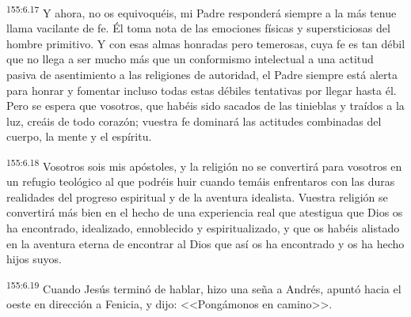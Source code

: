 \par 
\textsuperscript{155:6.17} Y ahora, no os equivoquéis, mi Padre responderá siempre a la más tenue llama vacilante de fe. Él toma nota de las emociones físicas y supersticiosas del hombre primitivo. Y con esas almas honradas pero temerosas, cuya fe es tan débil que no llega a ser mucho más que un conformismo intelectual a una actitud pasiva de asentimiento a las religiones de autoridad, el Padre siempre está alerta para honrar y fomentar incluso todas estas débiles tentativas por llegar hasta él. Pero se espera que vosotros, que habéis sido sacados de las tinieblas y traídos a la luz, creáis de todo corazón; vuestra fe dominará las actitudes combinadas del cuerpo, la mente y el espíritu.

\par 
\textsuperscript{155:6.18} Vosotros sois mis apóstoles, y la religión no se convertirá para vosotros en un refugio teológico al que podréis huir cuando temáis enfrentaros con las duras realidades del progreso espiritual y de la aventura idealista. Vuestra religión se convertirá más bien en el hecho de una experiencia real que atestigua que Dios os ha encontrado, idealizado, ennoblecido y espiritualizado, y que os habéis alistado en la aventura eterna de encontrar al Dios que así os ha encontrado y os ha hecho hijos suyos.

\par 
\textsuperscript{155:6.19} Cuando Jesús terminó de hablar, hizo una seña a Andrés, apuntó hacia el oeste en dirección a Fenicia, y dijo: <<Pongámonos en camino>>.